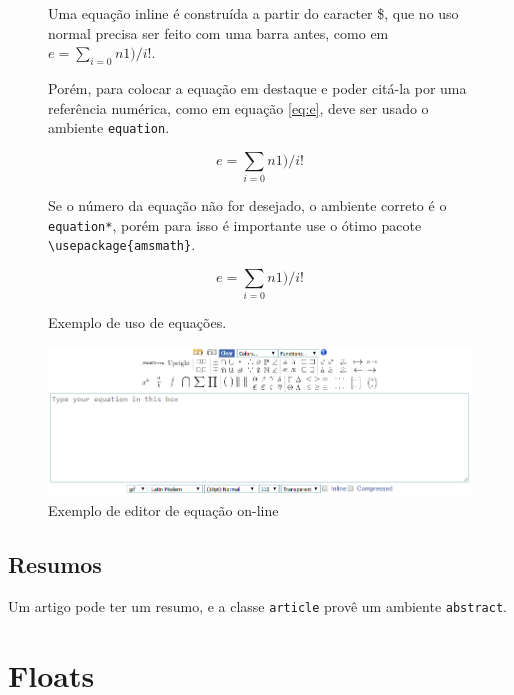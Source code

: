 \begin{figure}
    \begin{LTXexample}[pos=b]
Uma equação inline é construída a partir do caracter
\$, que no uso normal precisa ser feito com uma barra
antes, como em $e=\sum_{i=0}{n}1)/i!$.

Porém, para colocar a equação em destaque e poder citá-la
por uma referência numérica, como em equação \ref{eq:e},
deve ser usado o ambiente
 \lstinline|equation|.

\begin{equation}\label{eq:e}
e=\sum_{i=0}{n}1)/i!
\end{equation}

Se o número da equação não for desejado, o ambiente
correto é o \lstinline|equation*|, porém para isso é
 importante use o ótimo pacote
  \lstinline|\usepackage{amsmath}|.


\begin{equation*}
e=\sum_{i=0}{n}1)/i!
\end{equation*}

    \end{LTXexample}
    \caption{Exemplo de uso de equações.}
    \label{fig:eq}
\end{figure}



    \begin{figure}[hbt]
    \centering
    \includegraphics[width=.8\linewidth]{Images/equationeditor.png}
    \caption{Exemplo de editor de equação on-line}
    \label{fig:editor:eq}
\end{figure}

\subsection{Resumos}
Um artigo pode ter um resumo, e a classe \lstinline|article| provê um ambiente \lstinline|abstract|.
    

\section{Floats}

